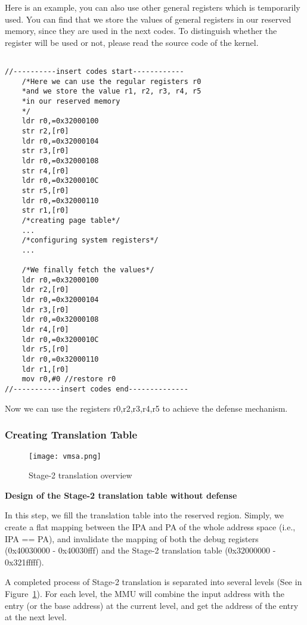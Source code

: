 Here is an example, you can also use other general registers which is temporarily used.
You can find that we store the values of general registers in our reserved memory, since they are used in the next codes. To distinguish whether the register will be used or not, please read the source code of the kernel.

\begin{lstlisting}

//----------insert codes start------------
	/*Here we can use the regular registers r0
	*and we store the value r1, r2, r3, r4, r5
	*in our reserved memory
	*/
	ldr r0,=0x32000100
	str r2,[r0]
	ldr r0,=0x32000104
	str r3,[r0]
	ldr r0,=0x32000108
	str r4,[r0]
	ldr r0,=0x3200010C
	str r5,[r0]
	ldr r0,=0x32000110
	str r1,[r0]
	/*creating page table*/
	...
	/*configuring system registers*/
	...

	/*We finally fetch the values*/
	ldr r0,=0x32000100
	ldr r2,[r0]
	ldr r0,=0x32000104
	ldr r3,[r0]
	ldr r0,=0x32000108
	ldr r4,[r0]
	ldr r0,=0x3200010C
	ldr r5,[r0]
	ldr r0,=0x32000110
	ldr r1,[r0]
	mov r0,#0 //restore r0
//-----------insert codes end--------------

\end{lstlisting}

Now we can use the registers r0,r2,r3,r4,r5 to achieve the defense mechanism.

\subsubsection{Creating Translation Table}

\begin{figure}[htb]
	\centering
	\texttt{[image: vmsa.png]}
	\caption{Stage-2 translation overview}
	\label{fig:vmsa}
\end{figure}

\vspace{10pt}
\textbf{Design of the Stage-2 translation table without defense}
\vspace{10pt}

In this step, we fill the translation table into the reserved region. 
Simply, we create a flat mapping between the IPA and PA of the whole address space (i.e., IPA == PA), and invalidate the mapping of both the debug registers (0x40030000 - 0x40030fff) and the Stage-2 translation table (0x32000000 - 0x321fffff).

A completed process of Stage-2 translation is separated into several levels (See in Figure~\ref{fig:vmsa}). For each level, the MMU will combine the input address with the entry (or the base address) at the current level, and get the address of the entry at the next level. 


